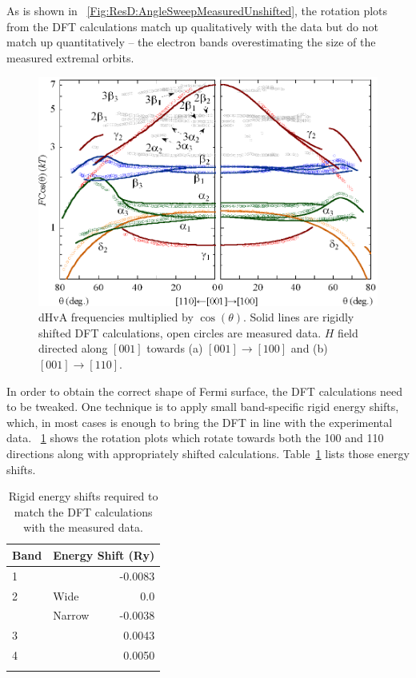 As is shown in \fig~\ref{Fig:ResD:AngleSweepMeasuredUnshifted}, the rotation plots from the DFT calculations match up qualitatively with the data but do not match up quantitatively -- the electron bands overestimating the size of the measured extremal orbits. 

\begin{figure}[htbp]
    \begin{center}
        \includegraphics[scale=0.9]{Chapter-dHvABaFe2P2/Figures/AngleDepMeasurements/AngleSweepRigidShift/AngleSweepRigidShift}
        \caption{dHvA frequencies multiplied by $\cos(\theta)$. Solid lines are rigidly shifted DFT calculations, open circles are measured data. $H$ field directed along $[001]$ towards (a) $[001]\rightarrow[100]$ and (b) $[001]\rightarrow[110]$.}
        \label{Fig:ResD:AngleSweepRigidShift}
    \end{center}
\end{figure}

In order to obtain the correct shape of Fermi surface, the DFT calculations need to be tweaked. One technique is to apply small band-specific rigid energy shifts, which, in most cases is enough to bring the DFT in line with the experimental data. \fig~\ref{Fig:ResD:AngleSweepRigidShift} shows the rotation plots which rotate towards both the 100 and 110 directions along with appropriately shifted calculations. Table~\ref{Tab:ResD:EnergyShifts} lists those energy shifts.
\begin{table}
    \begin{center}
        \caption{Rigid energy shifts required to match the DFT calculations with the measured data.}
        \begin{tabular}[htbp]{llr}
\toprule
Band    & \multicolumn{2}{l}{Energy Shift (\unit{Ry})} \\
\midrule
1       &       & -0.0083      \\
2       & Wide  & 0.0          \\
        & Narrow & -0.0038     \\
3       &       & 0.0043       \\
4       &       & 0.0050        \\
\bottomrule
        \label{Tab:ResD:EnergyShifts}
        \end{tabular}
    \end{center}
\end{table}

